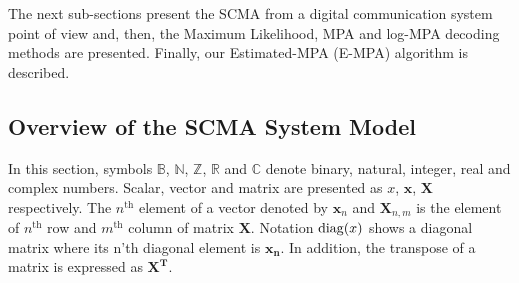
The next sub-sections present the SCMA from a digital communication system
point of view and, then, the Maximum Likelihood, MPA and log-MPA decoding
methods are presented. Finally, our Estimated-MPA (E-MPA) algorithm is
described.

\subsection{Overview of the SCMA System Model}
\label{sec:alg_scma_overview}

In this section, symbols $\mathbb{B}$, $\mathbb{N}$, $\mathbb{Z}$, $\mathbb{R}$
and $\mathbb{C}$ denote binary, natural, integer, real and complex numbers.
Scalar, vector and matrix are presented as $x$, $\bm{x}$, $\bm{X}$ respectively.
The $n^\text{th}$ element of a vector denoted by $\bm{x}_n$ and $\bm{X}_{n,m}$
is the element of $n^\text{th}$ row and $m^\text{th}$ column of matrix $\bm{X}$.
Notation $\operatorname{diag}(x)$ shows a diagonal matrix where its n'th diagonal element is
$\bm{x_n}$. In addition, the transpose of a matrix is expressed as $\bm{X^T}$.

